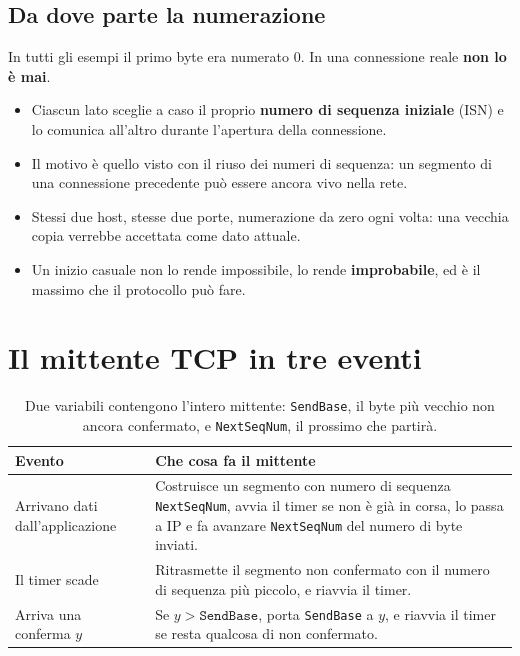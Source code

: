 \subsection{Da dove parte la numerazione}

In tutti gli esempi il primo byte era numerato 0. In una connessione reale \textbf{non lo è mai}.
\begin{itemize}
    \item Ciascun lato sceglie a caso il proprio \textbf{numero di sequenza iniziale} (ISN) e lo comunica all'altro durante
          l'apertura della connessione.
    \item Il motivo è quello visto con il riuso dei numeri di sequenza: un segmento di una connessione precedente può essere
          ancora vivo nella rete.
    \item Stessi due host, stesse due porte, numerazione da zero ogni volta: una vecchia copia verrebbe accettata come
          dato attuale.
    \item Un inizio casuale non lo rende impossibile, lo rende \textbf{improbabile}, ed è il massimo che il protocollo può
          fare.
\end{itemize}

\section{Il mittente TCP in tre eventi}

\begin{table}[H]
\centering
\begin{tabular}{p{} p{}}
\toprule
\textbf{Evento} & \textbf{Che cosa fa il mittente} \\
\midrule
Arrivano dati dall'applicazione &
Costruisce un segmento con numero di sequenza \texttt{NextSeqNum}, avvia il timer se non è già in corsa, lo passa a IP e
fa avanzare \texttt{NextSeqNum} del numero di byte inviati. \\
Il timer scade &
Ritrasmette il segmento non confermato con il numero di sequenza più piccolo, e riavvia il timer. \\
Arriva una conferma $y$ &
Se $y > \texttt{SendBase}$, porta \texttt{SendBase} a $y$, e riavvia il timer se resta qualcosa di non confermato. \\
\bottomrule
\end{tabular}
\caption{Due variabili contengono l'intero mittente: \texttt{SendBase}, il byte più vecchio non ancora confermato, e
         \texttt{NextSeqNum}, il prossimo che partirà.}
\end{table}

